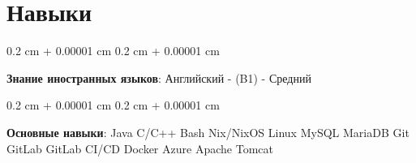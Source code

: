 \documentclass[10pt, letterpaper]{article}
\newenvironment{onecolentry}{
    \begin{adjustwidth}{
        0.2 cm + 0.00001 cm
    }{
        0.2 cm + 0.00001 cm
    }
}{
    \end{adjustwidth}
} %
\begin{document}
    \vspace{0.3 cm - 0.3 cm}

    \section{Навыки}
        \begin{onecolentry}
            \textbf{Знание иностранных языков}: Английский - (B1) - Средний
        \end{onecolentry}
         \vspace{0.2 cm}
        
        \begin{onecolentry}
            \textbf{Основные навыки}:
            \colorbox{gray!15}{Java} 
            \colorbox{gray!15}{C/C++} 
            \colorbox{gray!15}{Bash}
            \colorbox{gray!15}{Nix/NixOS}
            \colorbox{gray!15}{Linux}
            \colorbox{gray!15}{MySQL}
            \colorbox{gray!15}{MariaDB}
            \colorbox{gray!15}{Git}
            \colorbox{gray!15}{GitLab}
            \colorbox{gray!15}{GitLab CI/CD}
            \colorbox{gray!15}{Docker}
            \colorbox{gray!15}{Azure}
            \colorbox{gray!15}{Apache}
            \colorbox{gray!15}{Tomcat}
        \end{onecolentry}
\end{document}
